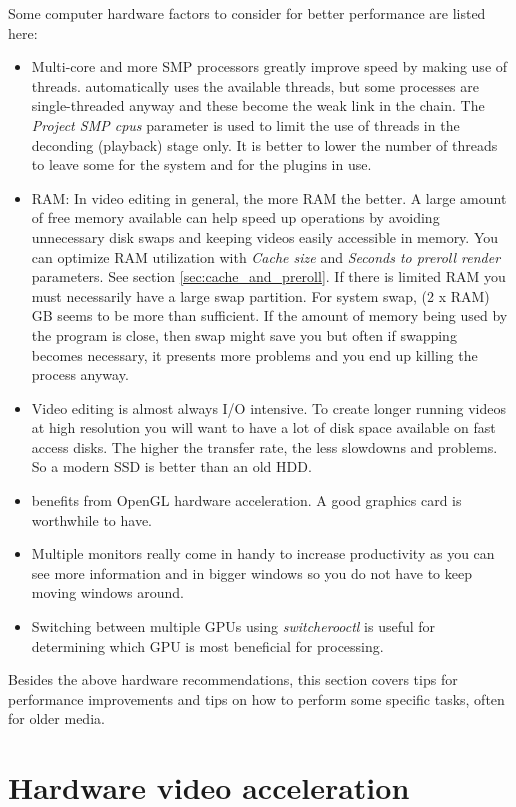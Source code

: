 Some computer hardware factors to consider for better performance are listed here:
\begin{itemize}
	\item Multi-core and more SMP processors greatly improve speed by making use of threads. \CGG{} automatically uses the available threads, but some processes are single-threaded anyway and these become the weak link in the chain. The \textit{Project SMP cpus} parameter is used to limit the use of threads in the deconding (playback) stage only. It is better to lower the number of threads to leave some for the system and for the plugins in use.
	\item RAM: In video editing in general, the more RAM the better. A large amount of free memory available can help speed up operations by avoiding unnecessary disk swaps and keeping videos easily accessible in memory. 
You can optimize RAM utilization with \textit{Cache size} and \textit{Seconds to preroll render} parameters. See section \ref{sec:cache_and_preroll}. If there is limited RAM you must necessarily have a large swap partition. For system swap, (2 x RAM) GB seems to be more than sufficient. If the amount of memory being used by the program is close, then swap might save you but often if swapping becomes necessary, it presents more problems and you end up killing the \CGG{} process anyway.
	\item Video editing is almost always I/O intensive. To create longer running videos at high resolution
	you will want to have a lot of disk space available on fast access disks. The higher the transfer rate, the less slowdowns and problems. So a modern SSD is better than an old HDD.
	\item \CGG{} benefits from OpenGL hardware acceleration. A good graphics card is worthwhile to have.
	\item Multiple monitors really come in handy to increase productivity as you can see more information and
	in bigger windows so you do not have to keep moving windows around.
	\item Switching between multiple GPUs using \textit{switcherooctl} is useful for determining which GPU is most beneficial for processing.
\end{itemize}
Besides the above hardware recommendations, this section covers tips for performance improvements and tips on how to perform some specific tasks, often for older media.

\section{Hardware video acceleration}%
\label{sec:hardware_video_acceleration}

